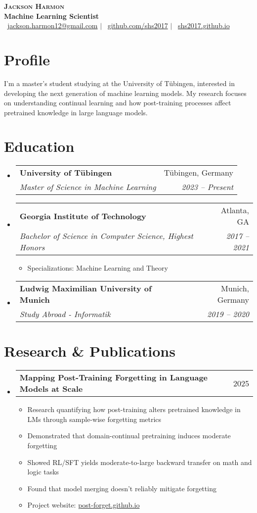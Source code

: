 \documentclass[letterpaper,11pt]{article}
\makeatletter
\newcommand{\resumeItem}[1]{
  \item\small{
    {#1 \vspace{-2pt}}
  }
}
\newcommand{\resumeSubheading}[4]{
  \vspace{-2pt}\item
    \begin{tabular*}{0.97\textwidth}[t]{l@{\extracolsep{\fill}}r}
      \textbf{#1} & #2 \\
      \textit{\small#3} & \textit{\small #4} \\
    \end{tabular*}\vspace{-7pt}
}
\newcommand{\resumeProjectHeading}[2]{
    \item
    \begin{tabular*}{0.97\textwidth}{l@{\extracolsep{\fill}}r}
      \small#1 & #2 \\
    \end{tabular*}\vspace{-7pt}
}
\newcommand{\resumeSubHeadingListStart}{\begin{itemize}[leftmargin=0.15in, label={}]}
\newcommand{\resumeSubHeadingListEnd}{\end{itemize}}
\newcommand{\resumeItemListStart}{\begin{itemize}}
\newcommand{\resumeItemListEnd}{\end{itemize}\vspace{-5pt}}
\makeatother
\begin{document}
\begin{center}
    \textbf{\Huge \scshape Jackson Harmon} \\ \vspace{1pt}
    \textbf{\large Machine Learning Scientist} \\ \vspace{5pt}
    \small \faEnvelope\ \href{mailto:jackson.harmon12@gmail.com}{jackson.harmon12@gmail.com} $|$ 
    \faGithub\ \href{https://github.com/shs2017}{github.com/shs2017} $|$
    \faLink\ \href{https://shs2017.github.io}{shs2017.github.io}
\end{center}


\section{Profile}
I'm a master's student studying at the University of Tübingen, interested in developing the next generation of machine learning models. My research focuses on understanding continual learning and how post-training processes affect pretrained knowledge in large language models.


\section{Education}
  \resumeSubHeadingListStart
    \resumeSubheading
      {University of Tübingen}{Tübingen, Germany}
      {Master of Science in Machine Learning}{2023 -- Present}
      
    \resumeSubheading
      {Georgia Institute of Technology}{Atlanta, GA}
      {Bachelor of Science in Computer Science, Highest Honors}{2017 -- 2021}
      \resumeItemListStart
        \resumeItem{Specializations: Machine Learning and Theory}
      \resumeItemListEnd
      
    \resumeSubheading
      {Ludwig Maximilian University of Munich}{Munich, Germany}
      {Study Abroad - Informatik}{2019 -- 2020}
  \resumeSubHeadingListEnd


\section{Research \& Publications}
  \resumeSubHeadingListStart
    \resumeProjectHeading
      {\textbf{Mapping Post-Training Forgetting in Language Models at Scale}}{2025}
      \resumeItemListStart
        \resumeItem{Research quantifying how post-training alters pretrained knowledge in LMs through sample-wise forgetting metrics}
        \resumeItem{Demonstrated that domain-continual pretraining induces moderate forgetting}
        \resumeItem{Showed RL/SFT yields moderate-to-large backward transfer on math and logic tasks}
        \resumeItem{Found that model merging doesn't reliably mitigate forgetting}
        \resumeItem{Project website: \href{https://post-forget.github.io/}{post-forget.github.io}}
      \resumeItemListEnd
  \resumeSubHeadingListEnd
\end{document}
